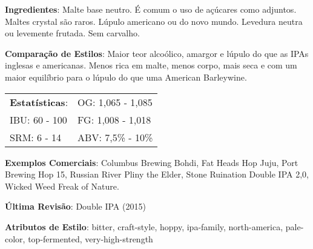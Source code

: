 \textbf{Ingredientes}: Malte base neutro. É comum o uso de açúcares como adjuntos. Maltes crystal são raros. Lúpulo americano ou do novo mundo. Levedura neutra ou levemente frutada. Sem carvalho.

\textbf{Comparação de Estilos}: Maior teor alcoólico, amargor e lúpulo do que as IPAs inglesas e americanas. Menos rica em malte, menos corpo, mais seca e com um maior equilíbrio para o lúpulo do que uma American Barleywine.

\begin{tabular}{@{}p{35mm}p{35mm}@{}}
  \textbf{Estatísticas}: & OG: 1,065 - 1,085  \\
  IBU: 60 - 100  & FG: 1,008 - 1,018   \\
  SRM: 6 - 14 & ABV: 7,5\% - 10\%
\end{tabular}

\textbf{Exemplos Comerciais}: Columbus Brewing Bohdi, Fat Heads Hop Juju, Port Brewing Hop 15, Russian River Pliny the Elder, Stone Ruination Double IPA 2,0, Wicked Weed Freak of Nature.

\textbf{Última Revisão}: Double IPA (2015)

\textbf{Atributos de Estilo}: bitter, craft-style, hoppy, ipa-family, north-america, pale-color, top-fermented, very-high-strength
